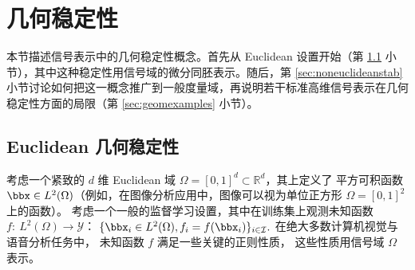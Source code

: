 \section{几何稳定性}
\label{sec:geometry}

本节描述信号表示中的几何稳定性概念。首先从 Euclidean 设置开始（第 \ref{sec:euclideangeom} 小节），其中这种稳定性用信号域的微分同胚表示。随后，第 \ref{sec:noneuclideanstab} 小节讨论如何把这一概念推广到一般度量域，再说明若干标准高维信号表示在几何稳定性方面的局限（第 \ref{sec:geomexamples} 小节）。



\subsection{Euclidean 几何稳定性}
\label{sec:euclideangeom}
考虑一个紧致的 $d$ 维 Euclidean 域 $\Omega = [0,1]^d \subset \mathbb{R}^d$，其上定义了
平方可积函数 $\bbx\in L^2(\Omega)$（例如，在图像分析应用中，图像可以视为单位正方形 $\Omega = [0,1]^2$ 上的函数）。
%
考虑一个一般的监督学习设置，其中在训练集上观测未知函数
$f : ~ L^2(\Omega) \to \mathcal{Y}$：
$\{ \bbx_i \in L^2(\Omega), f_i = f(\bbx_i) \}_{i \in \mathcal{I}}.$ 
%
在绝大多数计算机视觉与语音分析任务中，
未知函数 $f$ 满足一些关键的正则性质，
这些性质用信号域 $\Omega$ 表示。
%

